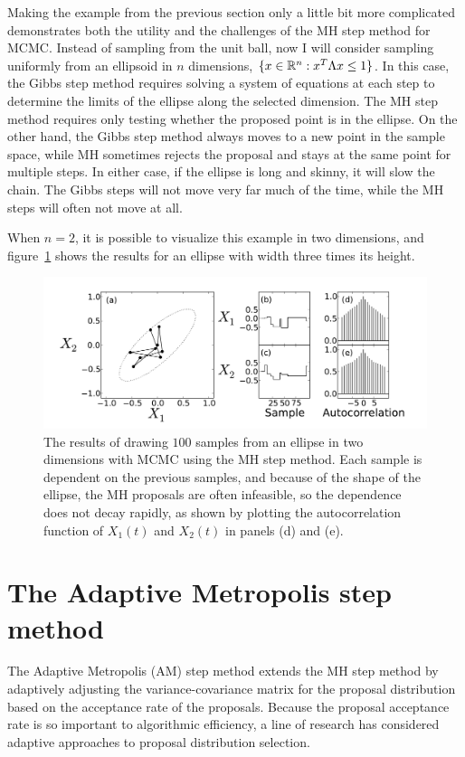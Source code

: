 Making the example from the previous section only a little bit more
complicated demonstrates both the utility and the challenges of the MH
step method for MCMC.  Instead of sampling from the unit ball, now I
will consider sampling uniformly from an ellipsoid in $n$ dimensions,
$\{x\in \mathbb{R}^n : x^T \Lambda x \leq 1\}$.  In this case, the Gibbs
step method requires solving a system of equations at each step to
determine the limits of the ellipse along the selected dimension.  The
MH step method requires only testing whether the proposed point is in the
ellipse.  On the other hand, the Gibbs step method always moves to a
new point in the sample space, while MH sometimes rejects the proposal
and stays at the same point for multiple steps.  In either case, if
the ellipse is long and skinny, it will slow the chain.  The Gibbs
steps will not move very far much of the time, while the MH steps will
often not move at all.

When $n=2$, it is possible to visualize this example in two
dimensions, and figure~\ref{metropolis-ball} shows the results for an
ellipse with width three times its height.

\begin{figure}[ht]
\begin{center}
\includegraphics[width=\textwidth]{metropolis-ball.pdf}
\caption[The results of drawing $100$ samples from an ellipse in two
  dimensions with MCMC using the MH step method.]{The results 
  of drawing $100$ samples from an ellipse in two
  dimensions with MCMC using the MH step method.  Each sample is
  dependent on the previous samples, and because of the shape of the
  ellipse, the MH proposals are often infeasible, so the dependence
  does not decay rapidly, as shown by plotting the autocorrelation
  function of $X_1(t)$ and $X_2(t)$ in panels (d) and (e).}
\label{metropolis-ball}
\end{center}
\end{figure}


\section{The Adaptive Metropolis step method}
The Adaptive Metropolis (AM) step method extends the
MH step method by adaptively adjusting the
variance-covariance matrix for the proposal distribution based on the
acceptance rate of the
proposals.\cite{haario_adaptive_2001,patil_pymc:_2010} Because the
proposal acceptance rate is so important to algorithmic efficiency, a
line of research has considered adaptive approaches to proposal
distribution
selection.\cite{gelman_efficient_1996,gilks_adaptive_1994,
  gilks_adaptive_1998,sahu_self_1999}

